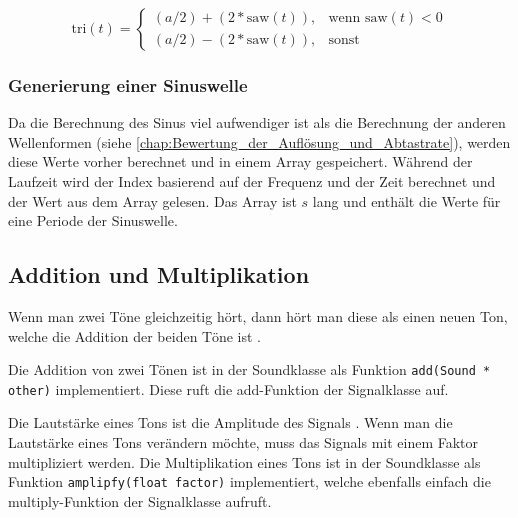 \begin{equation}
    \text{tri}(t) = \begin{cases}
        (a/2) + (2*\text{saw}(t)), & \text{wenn } \text{saw}(t) < 0 \\
        (a/2) - (2*\text{saw}(t)), & \text{sonst}
    \end{cases}
\end{equation}

\subsubsection{Generierung einer Sinuswelle}

Da die Berechnung des Sinus viel aufwendiger ist 
als die Berechnung der anderen Wellenformen
(siehe \ref{chap:Bewertung_der_Auflösung_und_Abtastrate}),
werden diese Werte vorher berechnet und in einem Array gespeichert.
Während der Laufzeit wird der Index basierend auf der Frequenz und der
Zeit berechnet und der Wert aus dem Array gelesen.
Das Array ist $s$ lang und enthält die Werte für eine Periode der 
Sinuswelle.



\subsection{Addition und Multiplikation}
\label{chap:addition_and_multiplication}

Wenn man zwei Töne gleichzeitig hört, dann hört man diese als
einen neuen Ton, welche die Addition der beiden Töne ist \cite[16.5]{openStacksWaves}.

Die Addition von zwei Tönen ist in der Soundklasse als Funktion 
\lstinline{add(Sound * other)} implementiert. Diese ruft die 
add-Funktion der Signalklasse auf. 

Die Lautstärke eines Tons ist die Amplitude des Signals \cite{soundIntensety}.
Wenn man die Lautstärke eines Tons verändern möchte, 
muss das Signals mit einem Faktor multipliziert werden.
Die Multiplikation eines Tons ist in der Soundklasse als Funktion
\lstinline{amplipfy(float factor)} implementiert, welche ebenfalls einfach
die multiply-Funktion der Signalklasse aufruft.

